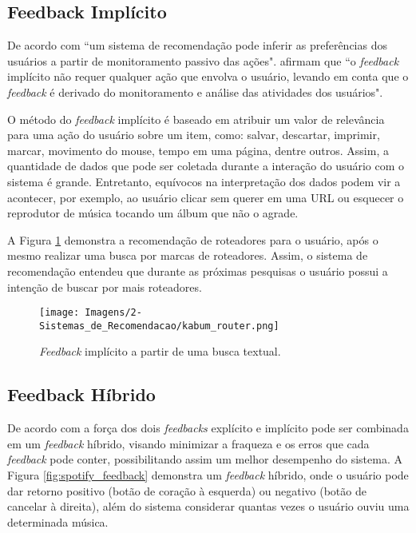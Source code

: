 \subsection{Feedback Implícito}
De acordo com  ``um sistema de recomendação pode inferir as preferências dos usuários a partir de monitoramento passivo das ações".  afirmam que ``o \textit{feedback} implícito não requer qualquer ação que envolva o usuário, levando em conta que o \textit{feedback} é derivado do monitoramento e análise das atividades dos usuários". 

O método do \textit{feedback} implícito é baseado em atribuir um valor de relevância para uma ação do usuário sobre um item, como: salvar, descartar, imprimir, marcar, movimento do mouse, tempo em uma página, dentre outros. Assim, a quantidade de dados que pode ser coletada durante a interação do usuário com o sistema é grande. Entretanto, equívocos na interpretação dos dados podem vir a acontecer, por exemplo, ao usuário clicar sem querer em uma URL ou esquecer o reprodutor de música tocando um álbum que não o agrade. 

A Figura \ref{fig:kabum_feedback} demonstra a recomendação de roteadores para o usuário, após o mesmo realizar uma busca por marcas de roteadores. Assim, o sistema de recomendação entendeu que durante as próximas pesquisas o usuário possui a intenção de buscar por mais roteadores. 

\begin{figure}[hbt!]
    \centering
    \texttt{[image: Imagens/2-Sistemas\_de\_Recomendacao/kabum\_router.png]}
    \caption{\textit{Feedback} implícito a partir de uma busca textual.}
    \label{fig:kabum_feedback}
\end{figure}

\subsection{Feedback Híbrido}
De acordo com  a força dos dois \textit{feedbacks} explícito e implícito pode ser combinada em um \textit{feedback} híbrido, visando minimizar a fraqueza e os erros que cada \textit{feedback} pode conter, possibilitando assim um melhor desempenho do sistema. A Figura \ref{fig:spotify_feedback} demonstra um \textit{feedback} híbrido, onde o usuário pode dar retorno positivo (botão de coração à esquerda) ou negativo (botão de cancelar à direita), além do sistema considerar quantas vezes o usuário ouviu uma determinada música.


